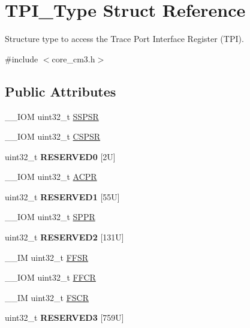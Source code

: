 \hypertarget{struct_t_p_i___type}{\section{T\-P\-I\-\_\-\-Type Struct Reference}
\label{struct_t_p_i___type}
}


Structure type to access the Trace Port Interface Register (T\-P\-I).  




{\ttfamily \#include $<$core\-\_\-cm3.\-h$>$}

\subsection*{Public Attributes}
\begin{DoxyCompactItemize}
\item 
\-\_\-\-\_\-\-I\-O\-M uint32\-\_\-t \hyperlink{struct_t_p_i___type_a7b72598e20066133e505bb781690dc22}{S\-S\-P\-S\-R}
\item 
\-\_\-\-\_\-\-I\-O\-M uint32\-\_\-t \hyperlink{struct_t_p_i___type_a8826aa84e5806053395a742d38d59d0f}{C\-S\-P\-S\-R}
\item 
\hypertarget{struct_t_p_i___type_a409fb08ad6d58c17fcb7f59d65db6f93}{uint32\-\_\-t {\bfseries R\-E\-S\-E\-R\-V\-E\-D0} \mbox{[}2\-U\mbox{]}}\label{struct_t_p_i___type_a409fb08ad6d58c17fcb7f59d65db6f93}

\item 
\-\_\-\-\_\-\-I\-O\-M uint32\-\_\-t \hyperlink{struct_t_p_i___type_a9e5e4421ef9c3d5b7ff8b24abd4e99b3}{A\-C\-P\-R}
\item 
\hypertarget{struct_t_p_i___type_abc2f542560b78ccbbf0a44aadb5651fb}{uint32\-\_\-t {\bfseries R\-E\-S\-E\-R\-V\-E\-D1} \mbox{[}55\-U\mbox{]}}\label{struct_t_p_i___type_abc2f542560b78ccbbf0a44aadb5651fb}

\item 
\-\_\-\-\_\-\-I\-O\-M uint32\-\_\-t \hyperlink{struct_t_p_i___type_a12f79d4e3ddc69893ba8bff890d04cc5}{S\-P\-P\-R}
\item 
\hypertarget{struct_t_p_i___type_ae6a238467f129df7440d97de8b58fe03}{uint32\-\_\-t {\bfseries R\-E\-S\-E\-R\-V\-E\-D2} \mbox{[}131\-U\mbox{]}}\label{struct_t_p_i___type_ae6a238467f129df7440d97de8b58fe03}

\item 
\-\_\-\-\_\-\-I\-M uint32\-\_\-t \hyperlink{struct_t_p_i___type_a6c47a0b4c7ffc66093ef993d36bb441c}{F\-F\-S\-R}
\item 
\-\_\-\-\_\-\-I\-O\-M uint32\-\_\-t \hyperlink{struct_t_p_i___type_a3f68b6e73561b4849ebf953a894df8d2}{F\-F\-C\-R}
\item 
\-\_\-\-\_\-\-I\-M uint32\-\_\-t \hyperlink{struct_t_p_i___type_ad6901bfd8a0089ca7e8a20475cf494a8}{F\-S\-C\-R}
\item 
\hypertarget{struct_t_p_i___type_aba65c646f0447ebda95bf09b726ff78a}{uint32\-\_\-t {\bfseries R\-E\-S\-E\-R\-V\-E\-D3} \mbox{[}759\-U\mbox{]}}\label{struct_t_p_i___type_aba65c646f0447ebda95bf09b726ff78a}


\end{DoxyCompactItemize}

